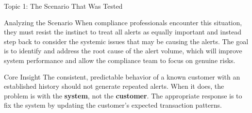 \documentclass[8pt]{beamer}  %
\begin{document}
\begin{frame}{Topic 1: The Scenario That Was Tested}
\begin{block}{\large Analyzing the Scenario}
			When compliance professionals encounter this situation, they must resist the instinct to treat all alerts as equally important and instead step back to consider the systemic issues that may be causing the alerts. The goal is to identify and address the root cause of the alert volume, which will improve system performance and allow the compliance team to focus on genuine risks.
		\end{block}
		
		\begin{alertblock}{Core Insight}
			The consistent, predictable behavior of a known customer with an established history should not generate repeated alerts. When it does, the problem is with the \textbf{system}, not the \textbf{customer}. The appropriate response is to fix the system by updating the customer's expected transaction patterns.
		\end{alertblock}
	\end{frame}
	
\end{document}
